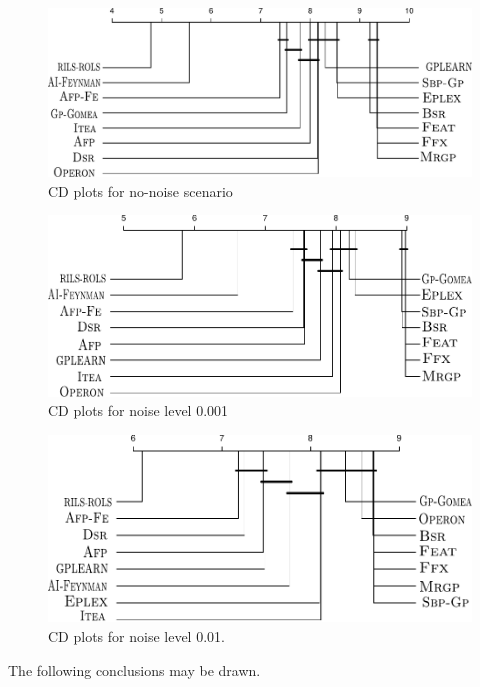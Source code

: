 \documentclass{bmcart}
\begin{document}
\begin{figure}[!h]
	\centering
		\includegraphics[width=350pt]{plots/Feynman_strogatz_noise_0_0-expanded.pdf}
		\caption{CD plots for no-noise scenario}
		\label{fig:CDplots-no-noise}
\end{figure}
	
\begin{figure}[!h]
	
	\includegraphics[width=350pt]{plots/Feynman_strogatz_noise_0_001-expanded.pdf}
	\caption{CD plots for noise level 0.001}
	\label{fig:CDplots-noise0.001}
\end{figure}
	
	\begin{figure}[!h]
		\includegraphics[width=350pt]{plots/Feynman_strogatz_noise_0_01-expanded.pdf}
		\caption{CD plots for noise level 0.01. }
		\label{fig:CDplots-noise0.01}
	\end{figure}

The following conclusions may be drawn.
\end{document}
